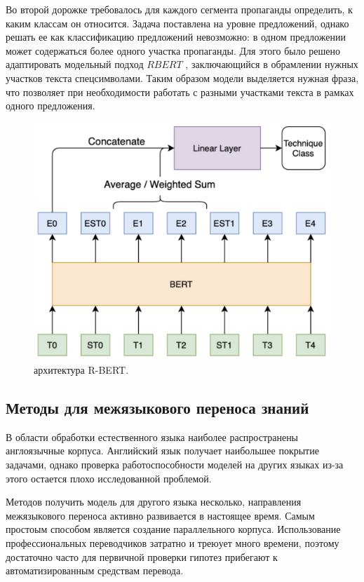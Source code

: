 Во второй дорожке требовалось для каждого сегмента пропаганды определить, к каким классам он относится. Задача поставлена на уровне предложений, однако решать ее как классификацию предложений невозможно: в одном предложении может содержаться более одного участка пропаганды. Для этого было решено адаптировать модельный подход $RBERT$ \cite{wu2019enriching}, заключающийся в обрамлении нужных участков текста спецсимволами. Таким образом модели выделяется нужная фраза, что позволяет при необходимости работать с разными участками текста в рамках одного предложения.

\begin{figure}[h!]
\centering
\includegraphics[scale=.5]{rbert.png}
\caption{архитектура R-BERT.}
\label{Problem_Picture}
\end{figure}


\subsection{Методы для межязыкового переноса знаний}

В области обработки естественного языка наиболее распространены англоязычные корпуса. Английский язык получает наибольшее покрытие задачами, однако проверка работоспособности моделей на других языках из-за этого остается плохо исследованной проблемой.

Методов получить модель для другого языка несколько, направления межязыкового переноса активно развивается в настоящее время. Самым простоым способом является создание параллельного корпуса. Использование профессиональных переводчиков затратно и треюует много времени, поэтому достаточно часто для первичной проверки гипотез прибегают к автоматизированным средствам перевода.

